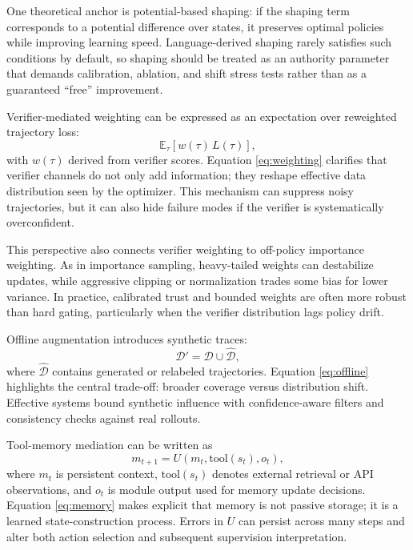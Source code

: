 ﻿\documentclass[conference]{IEEEtran}
\begin{document}
One theoretical anchor is potential-based shaping: if the shaping term corresponds to a potential difference over states, it preserves optimal policies while improving learning speed. Language-derived shaping rarely satisfies such conditions by default, so shaping should be treated as an authority parameter that demands calibration, ablation, and shift stress tests rather than as a guaranteed ``free'' improvement.

Verifier-mediated weighting can be expressed as an expectation over reweighted trajectory loss:
\begin{equation}
\mathbb{E}_{\tau}\left[w(\tau)\,L(\tau)\right],
\label{eq:weighting}
\end{equation}
with $w(\tau)$ derived from verifier scores. Equation \eqref{eq:weighting} clarifies that verifier channels do not only add information; they reshape effective data distribution seen by the optimizer. This mechanism can suppress noisy trajectories, but it can also hide failure modes if the verifier is systematically overconfident.

This perspective also connects verifier weighting to off-policy importance weighting. As in importance sampling, heavy-tailed weights can destabilize updates, while aggressive clipping or normalization trades some bias for lower variance. In practice, calibrated trust and bounded weights are often more robust than hard gating, particularly when the verifier distribution lags policy drift.

Offline augmentation introduces synthetic traces:
\begin{equation}
\mathcal{D}'=\mathcal{D}\cup\hat{\mathcal{D}},
\label{eq:offline}
\end{equation}
where $\hat{\mathcal{D}}$ contains generated or relabeled trajectories. Equation \eqref{eq:offline} highlights the central trade-off: broader coverage versus distribution shift. Effective systems bound synthetic influence with confidence-aware filters and consistency checks against real rollouts.

Tool-memory mediation can be written as
\begin{equation}
m_{t+1}=U\!\left(m_t,\mathrm{tool}(s_t),o_t\right),
\label{eq:memory}
\end{equation}
where $m_t$ is persistent context, $\mathrm{tool}(s_t)$ denotes external retrieval or API observations, and $o_t$ is module output used for memory update decisions. Equation \eqref{eq:memory} makes explicit that memory is not passive storage; it is a learned state-construction process. Errors in $U$ can persist across many steps and alter both action selection and subsequent supervision interpretation.
\end{document}

